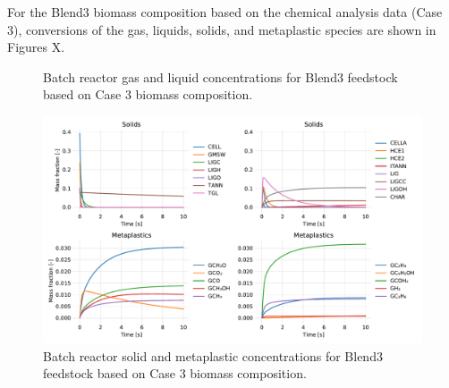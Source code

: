 For the Blend3 biomass composition based on the chemical analysis data (Case 3), conversions of the gas, liquids, solids, and metaplastic species are shown in Figures X.

\begin{figure}[H]
    \centering
    \caption{Batch reactor gas and liquid concentrations for Blend3 feedstock based on Case 3 biomass composition.}
    \label{fig:blend3-case3-gases-liquids}
\end{figure}

\begin{figure}[H]
    \centering
    \includegraphics[width=\textwidth]{figures/blend3-case3-solids-meta.pdf}
    \caption{Batch reactor solid and metaplastic concentrations for Blend3 feedstock based on Case 3 biomass composition.}
    \label{fig:blend3-case3-solids-meta}
\end{figure}

